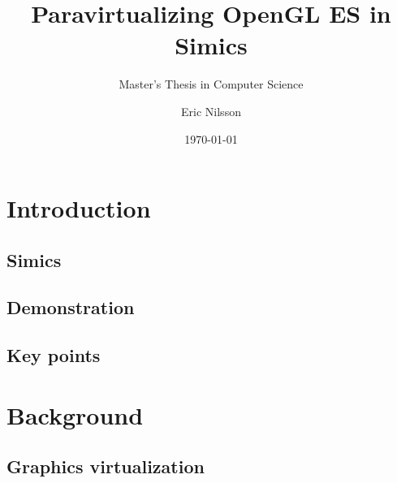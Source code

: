 \documentclass{beamer}
\title{Paravirtualizing OpenGL ES in Simics}
\subtitle{Master's Thesis in Computer Science}
\author{Eric Nilsson}
\institute{Blekinge Institute of Technology}
\date{\today} %
\begin{document}
	
	
	\section{Introduction}
	\subsection{Simics}
	
	\subsection{Demonstration}
	
	\subsection{Key points}
	

	\section{Background}
	\subsection{Graphics virtualization}
	

	

\end{document}
